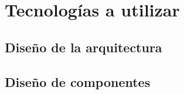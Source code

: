 \chapter{Tecnologías a utilizar}
\section{Diseño de la arquitectura}


\section{Diseño de componentes}
